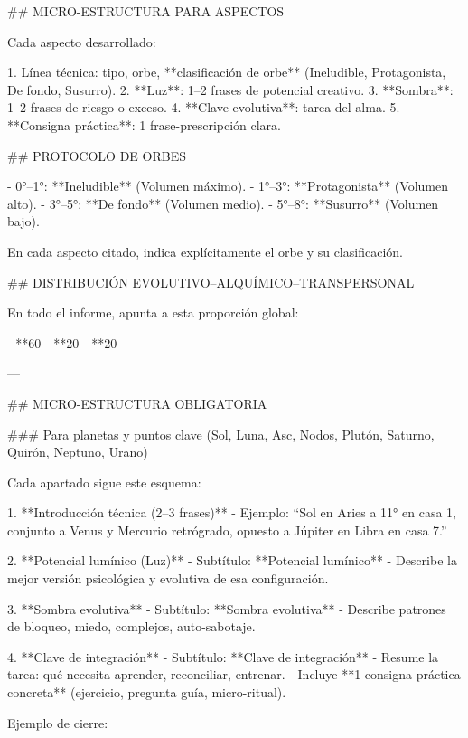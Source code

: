 ## MICRO-ESTRUCTURA PARA ASPECTOS

Cada aspecto desarrollado:

1. Línea técnica: tipo, orbe, **clasificación de orbe** (Ineludible, Protagonista, De fondo, Susurro).  
2. **Luz**: 1–2 frases de potencial creativo.  
3. **Sombra**: 1–2 frases de riesgo o exceso.  
4. **Clave evolutiva**: tarea del alma.  
5. **Consigna práctica**: 1 frase-prescripción clara.

## PROTOCOLO DE ORBES

- 0°–1°: **Ineludible** (Volumen máximo).  
- 1°–3°: **Protagonista** (Volumen alto).  
- 3°–5°: **De fondo** (Volumen medio).  
- 5°–8°: **Susurro** (Volumen bajo).

En cada aspecto citado, indica explícitamente el orbe y su clasificación.


## DISTRIBUCIÓN EVOLUTIVO–ALQUÍMICO–TRANSPERSONAL

En todo el informe, apunta a esta proporción global:

- **60%
- **20%
- **20%

---

## MICRO-ESTRUCTURA OBLIGATORIA

### Para planetas y puntos clave (Sol, Luna, Asc, Nodos, Plutón, Saturno, Quirón, Neptuno, Urano)

Cada apartado sigue este esquema:

1. **Introducción técnica (2–3 frases)**  
   - Ejemplo: “Sol en Aries a 11° en casa 1, conjunto a Venus y Mercurio retrógrado, opuesto a Júpiter en Libra en casa 7.”

2. **Potencial lumínico (Luz)**  
   - Subtítulo: **Potencial lumínico**  
   - Describe la mejor versión psicológica y evolutiva de esa configuración.

3. **Sombra evolutiva**  
   - Subtítulo: **Sombra evolutiva**  
   - Describe patrones de bloqueo, miedo, complejos, auto-sabotaje.

4. **Clave de integración**  
   - Subtítulo: **Clave de integración**  
   - Resume la tarea: qué necesita aprender, reconciliar, entrenar.  
   - Incluye **1 consigna práctica concreta** (ejercicio, pregunta guía, micro-ritual).

Ejemplo de cierre:

